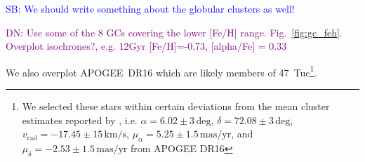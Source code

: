 \documentclass[fleqn,usenatbib,useAMS]{mnras}
\newcommand\SB[1]{\textcolor{blue}{SB: #1}}
\newcommand\DN[1]{\textcolor{purple}{DN: #1}}
\begin{document}
\SB{We should write something about the globular clusters as well!}

\DN{Use some of the 8 GCs covering the lower [Fe/H] range. Fig.~\ref{fig:gc_feh}. Overplot isochrones?, e.g. \citep{Thygesen2014} 12Gyr [Fe/H]=-0.73, [alpha/Fe] = 0.33}

We also overplot APOGEE~DR16 which are likely members of 47~Tuc\footnote{We selected these stars within certain deviations from the mean cluster estimates reported by \citet{Baumgardt2019}, i.e. $\alpha = 6.02 \pm 3\,\mathrm{deg}$,  $\delta = 72.08 \pm 3\,\mathrm{deg}$, $v_\text{rad} = -17.45 \pm 15 \,\mathrm{km/s}$, $\mu_\alpha = 5.25 \pm 1.5\,\mathrm{mas/yr}$, and $\mu_\delta = -2.53 \pm 1.5\,\mathrm{mas/yr}$ from APOGEE DR16}.

\end{document}
